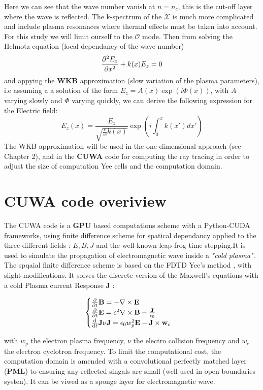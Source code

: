 \documentclass[11pt,a4paper,openany]{report}
\begin{document}
\begin{multicols}{2}
    Here we can see that the wave number vanish at $n = n_c$, this is the cut-off layer where the wave is reflected.
    The k-spectrum of the $\mathcal{X}$ is much more complicated and include plasma resonances where thermal effects must be taken into account. For this study we will limit ourself to the $\mathcal{O}$ mode. Then from solving the Helmotz equation (local dependancy of the wave number) $$\pdv[2]{E_z}{x} + k(x)E_z = 0$$ and appying the \textbf{WKB} approximation (slow variation of the plasma parameters), i.e assuming a a solution of the form $E_z = A(x) \exp(i\Phi(x))$, with $A$ varying slowly and $\Phi$ varying quickly, we can derive the following expression for the Electric field:
    $$E_z(x) = \frac{E_z}{\sqrt{\frac{c}{w}k(x)}}\exp\left(i\int_0^x k(x')dx'\right)$$
    The WKB approximation will be used in the one dimensional approach (see Chapter 2), and in the \textbf{CUWA} code for computing the ray tracing in order to adjust the size of computation Yee cells \cite{CUWA} and the computation domain.
    \section{CUWA code overiview}
    The CUWA code is a \textbf{GPU} based computations scheme with a Python-CUDA frameworks, using finite difference scheme for spatical dependancy applied to the three different fields :
    $E, B, J$ and the well-known leap-frog time stepping.It is used to simulate the propagation of electromagnetic wave inside a \textit{"cold plasma"}. The spqaial finite difference scheme is based on the FDTD Yee's method \cite{Yee}, with slight modifications.
    It solves the discrete version of the Maxwell's equations with a cold Plasma current Response $\textbf{J} $ :

    \begin{equation}
        \begin{cases}
            \pdv{t}\textbf{B}  = - \nabla \times \textbf{E}                                                 & \text{} \\
            \pdv{t}\textbf{E} = c^{2}\nabla \times \textbf{B} - \frac{\textbf{J} }{\epsilon_0 }             & \text{} \\
            \dv{t} \textbf{J} \nu \textbf{J} = \epsilon_0 w_p^2 \textbf{E} - \textbf{J} \times \textbf{w}_c & \text{} \\
        \end{cases}
        \label{eq:Maxwell}
    \end{equation}

    with $w_p$ the electron plasma frequency, $\nu$ the electro collision frequency and $w_c$ the electron cyclotron frequency. To limit the computational cost, the computation domain is amended with a convolutional perfectly matched layer (\textbf{PML}) to ensuring any reflected singals are small (well used in open boundaries systen). It can be viwed as a sponge layer for electromagnetic wave.

\end{multicols}
\end{document}
